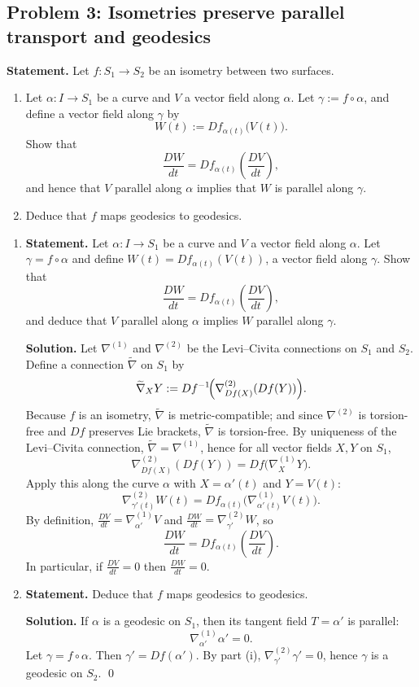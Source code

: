 \documentclass[12pt,a4paper]{article}
\theoremstyle{plain}
\theoremstyle{definition}      %
\begin{document}
\subsection*{Problem 3: Isometries preserve parallel transport and geodesics}
\textbf{Statement.}
Let $f:S_1\to S_2$ be an isometry between two surfaces.
\begin{enumerate}
	\item
	Let $\alpha:I\to S_1$ be a curve and $V$ a vector field along $\alpha$.
	Let $\gamma:=f\circ \alpha$, and define a vector field along $\gamma$ by
	\[
	W(t):=D f_{\alpha(t)}\bigl(V(t)\bigr).
	\]
	Show that
	\[
	\frac{DW}{dt}=D f_{\alpha(t)}\!\left(\frac{DV}{dt}\right),
	\]
	and hence that $V$ parallel along $\alpha$ implies that $W$ is parallel along $\gamma$.
	
	\item
	Deduce that $f$ maps geodesics to geodesics.
\end{enumerate}
	\begin{enumerate}
		\item
		\textbf{Statement.} Let $\alpha:I\to S_1$ be a curve and $V$ a vector field along $\alpha$.
		Let $\gamma=f\circ\alpha$ and define $W(t)=Df_{\alpha(t)}(V(t))$, a vector field along $\gamma$.
		Show that
		\[
		\frac{DW}{dt} = Df_{\alpha(t)}\!\left(\frac{DV}{dt}\right),
		\]
		and deduce that $V$ parallel along $\alpha$ implies $W$ parallel along $\gamma$.
		
		\bigskip
		\textbf{Solution.}
		Let $\nabla^{(1)}$ and $\nabla^{(2)}$ be the Levi--Civita connections on $S_1$ and $S_2$.
		Define a connection $\widetilde{\nabla}$ on $S_1$ by
		\[
		\widetilde{\nabla}_X Y := Df^{-1}\!\Bigl(\nabla^{(2)}_{Df(X)}(Df(Y))\Bigr).
		\]
		Because $f$ is an isometry, $\widetilde{\nabla}$ is metric-compatible; and since $\nabla^{(2)}$ is torsion-free and
		$Df$ preserves Lie brackets, $\widetilde{\nabla}$ is torsion-free. By uniqueness of the Levi--Civita connection,
		$\widetilde{\nabla}=\nabla^{(1)}$, hence for all vector fields $X,Y$ on $S_1$,
		\[
		\nabla^{(2)}_{Df(X)}(Df(Y)) = Df\bigl(\nabla^{(1)}_X Y\bigr).
		\]
		Apply this along the curve $\alpha$ with $X=\alpha'(t)$ and $Y=V(t)$:
		\[
		\nabla^{(2)}_{\gamma'(t)}W(t) = Df_{\alpha(t)}\!\bigl(\nabla^{(1)}_{\alpha'(t)}V(t)\bigr).
		\]
		By definition, $\frac{DV}{dt}=\nabla^{(1)}_{\alpha'}V$ and $\frac{DW}{dt}=\nabla^{(2)}_{\gamma'}W$, so
		\[
		\frac{DW}{dt} = Df_{\alpha(t)}\!\left(\frac{DV}{dt}\right).
		\]
		In particular, if $\frac{DV}{dt}=0$ then $\frac{DW}{dt}=0$.
		
		\item
		\textbf{Statement.} Deduce that $f$ maps geodesics to geodesics.
		
		\bigskip
		\textbf{Solution.}
		If $\alpha$ is a geodesic on $S_1$, then its tangent field $T=\alpha'$ is parallel:
		\[
		\nabla^{(1)}_{\alpha'}\alpha' = 0.
		\]
		Let $\gamma=f\circ\alpha$. Then $\gamma' = Df(\alpha')$. By part (i),
		$\nabla^{(2)}_{\gamma'}\gamma' = 0$, hence $\gamma$ is a geodesic on $S_2$.
		\qed
	\end{enumerate}
	
\end{document}
